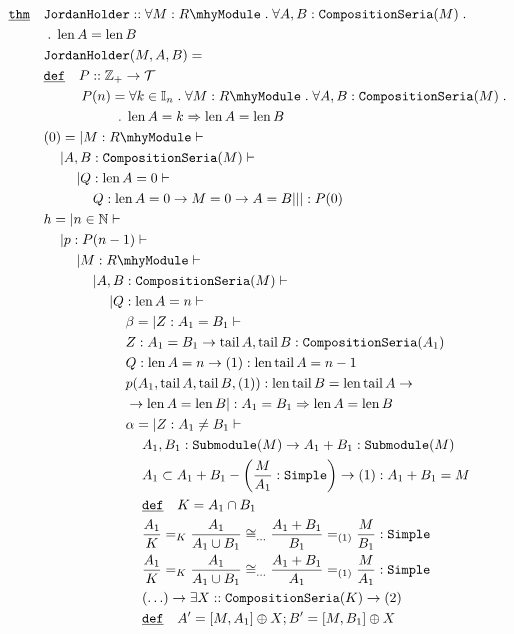 \documentclass[12pt]{article}
\DeclareMathOperator*{\len}{\mathrm{len}}
\DeclareMathOperator*{\tail}{\mathrm{tail}}
\renewcommand{\.}{\; . \;}
\newcommand{\nat}{\mathbb{N}}
\newcommand{\De}{\underline{\mathtt{def}} \quad}
\newcommand{\Thm}{\underline{\mathtt{thm}} \quad}
\newcommand{\module}[1]{{#1} \mhy \mathtt{Module}}
\newcommand{\submodule}[1]{\mathtt{Submodule}(#1)}
\newcommand{\simple}{\mathtt{Simple}}
\newcommand{\comps}{\mathtt{CompositionSeria}}
\newcommand{\context}{\vdash}
\begin{document}
\begin{align*}
\Thm & \mathtt{JordanHolder} :: \forall M : \module{R} \. \forall A,B : \comps(M) \. \\ 
&  \. \len A = \len B \\
&\mathtt{JordanHolder}(M,A,B) = \\ 
& \De P :: \mathbb{Z}_+ \to \mathcal{T} \\
& \kern 2.3pc P(n) = \forall k \in \mathbb{I}_n \. \forall  M : \module{R} \. \forall A,B
	: \comps(M) \. \\
&   \kern 4.3pc \. \len A = k \Rightarrow \len A =  \len B
\\& (0) = | M : \module{R} \context
\\& \kern 1pc | A,B : \comps(M)  \context
\\& \kern 2pc | Q : \len A = 0 \context
\\& \kern 3pc Q : \len A = 0 \to M = 0 \to A = B |||:P(0)
\\& h = | n \in \nat \context 
\\&  \kern 1pc | p : P(n-1) \context
\\& \kern 2pc | M : \module{R} \context
\\& \kern 3pc | A,B : \comps(M)  \context
\\& \kern 4pc | Q : \len A = n \context
\\& \kern 5pc \beta = | Z : A_1 = B _1 \context
\\& \kern 5pc  Z : A_1 = B_1 \to  \tail A, \tail B : \comps(A_1)
\\& \kern 5pc  Q : \len A = n  \to (1) : \len \tail A = n -1
\\& \kern 5pc p(A_1, \tail A, \tail B, (1)) : \len \tail B =  \len \tail A \to 
\\& \kern 5pc  \to \len A = \len B | : A_1 =B_1 \Rightarrow \len A = \len B 
\\& \kern 5pc \alpha = | Z : A_1 \neq B _1 \context
\\& \kern 6pc  A_1,B_1 : \submodule{M} \to A_1 + B_1 : \submodule{M}
\\& \kern 6pc A_1 \subset A_1 + B_1 -\left(\frac{M}{A_1} : \simple \right) \to (1) : A_1 + B_1 = M 
\\& \kern 6pc  \De K = A_1 \cap B_1 
\\& \kern 6pc  \frac{A_1}{K} =_K \frac{A_1}{A_1 \cup B_1}  
\cong_{\ldots} \frac{A_1 + B_1}{B_1 } =_{(1)}\frac{M}{B_1} : \simple
\\& \kern 6pc  \frac{A_1}{K} =_K \frac{A_1}{A_1 \cup B_1}  
\cong_{\ldots} \frac{A_1 + B_1}{A_1 } =_{(1)}\frac{M}{A_1} : \simple
\\&  \kern 6pc (\ldots) \to  \exists X :: \comps(K) \to (2)
\\& \kern 6pc \De A' = [M,A_1] \oplus X ; B' = [M,B_1] \oplus X
\end{align*}
\end{document}
